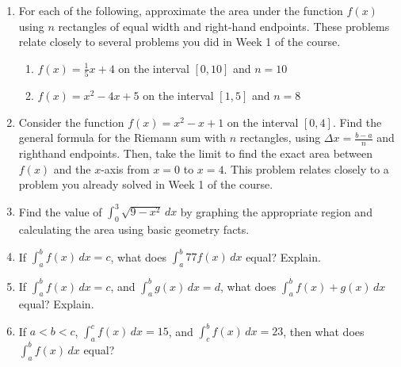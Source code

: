 \documentclass{article}
\begin{document}
\begin{itemize}
\begin{enumerate}
                        \item For each of the following, approximate the area under the function $f(x)$ using $n$ rectangles of equal width and right-hand endpoints. These problems relate closely to several problems you did in Week 1 of the course.
                            \begin{enumerate}
                                \item $\displaystyle f(x) = \frac{1}{5}x+4$ on the interval $[0,10]$ and $n=10$  \\ %
                                \item $\displaystyle  f(x) = x^2-4x+5$ on the interval $[1, 5]$ and $n=8$ \\ %
                            \end{enumerate}
                \item Consider the function $f(x) = x^2-x+1$ on the interval $[0,4]$.  Find the general formula for the Riemann sum with $n$ rectangles, using $\Delta x = \frac{b-a}{n}$ and righthand endpoints.  Then, take the limit to find the exact area between $f(x)$ and the $x$-axis from $x=0$ to $x=4$. This problem relates closely to a problem you already solved in Week 1 of the course. \\
                \item Find the value of $\displaystyle \int_{0}^{3} \sqrt{9-x^2}\,dx$ by graphing the appropriate region and calculating the area using basic geometry facts.
                \item If $\displaystyle \int_a^b f(x)\,dx = c$, what does $\displaystyle \int_a^b 77f(x)\,dx$ equal? Explain.
                \item If $\displaystyle \int_a^b f(x)\,dx = c$, and $\displaystyle \int_a^b g(x)\,dx = d$, what does $\displaystyle \int_a^b f(x)+g(x)\,dx$ equal? Explain.
                \item If $a < b < c$,  $\displaystyle \int_a^c f(x)\,dx = 15$, and $\displaystyle \int_c^b f(x)\,dx = 23$, then what does $\displaystyle \int_a^b f(x)\,dx$ equal?

\end{enumerate}
\end{itemize}
\end{document}
